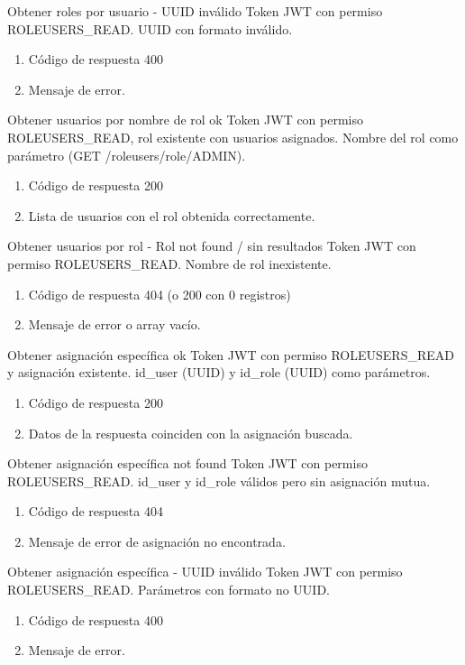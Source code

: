 {Obtener roles por usuario - UUID inválido}
{Token JWT con permiso ROLEUSERS\_READ.}
{UUID con formato inválido.}
{\begin{enumerate} [leftmargin=*, nosep]
    \item Código de respuesta 400
    \item Mensaje de error.
\end{enumerate}}

{Obtener usuarios por nombre de rol ok}
{Token JWT con permiso ROLEUSERS\_READ, rol existente con usuarios asignados.}
{Nombre del rol como parámetro (GET /roleusers/role/ADMIN).}
{\begin{enumerate} [leftmargin=*, nosep]
    \item Código de respuesta 200
    \item Lista de usuarios con el rol obtenida correctamente.
\end{enumerate}}

{Obtener usuarios por rol - Rol not found / sin resultados}
{Token JWT con permiso ROLEUSERS\_READ.}
{Nombre de rol inexistente.}
{\begin{enumerate} [leftmargin=*, nosep]
    \item Código de respuesta 404 (o 200 con 0 registros)
    \item Mensaje de error o array vacío.
\end{enumerate}}

{Obtener asignación específica ok}
{Token JWT con permiso ROLEUSERS\_READ y asignación existente.}
{id\_user (UUID) y id\_role (UUID) como parámetros.}
{\begin{enumerate} [leftmargin=*, nosep]
    \item Código de respuesta 200
    \item Datos de la respuesta coinciden con la asignación buscada.
\end{enumerate}}

{Obtener asignación específica not found}
{Token JWT con permiso ROLEUSERS\_READ.}
{id\_user y id\_role válidos pero sin asignación mutua.}
{\begin{enumerate} [leftmargin=*, nosep]
    \item Código de respuesta 404
    \item Mensaje de error de asignación no encontrada.
\end{enumerate}}

{Obtener asignación específica - UUID inválido}
{Token JWT con permiso ROLEUSERS\_READ.}
{Parámetros con formato no UUID.}
{\begin{enumerate} [leftmargin=*, nosep]
    \item Código de respuesta 400
    \item Mensaje de error.
\end{enumerate}}

